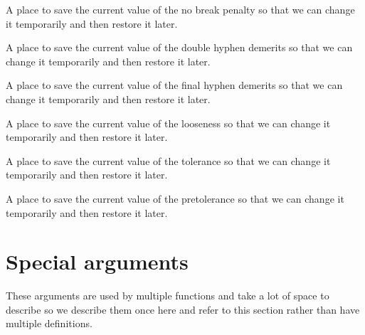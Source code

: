 A place to save the current value of the no break penalty so that we can change it temporarily and then restore it later.

A place to save the current value of the double hyphen demerits so that we can change it temporarily and then restore it later.

A place to save the current value of the final hyphen demerits so that we can change it temporarily and then restore it later.

A place to save the current value of the looseness so that we can change it temporarily and then restore it later.

A place to save the current value of the tolerance so that we can change it temporarily and then restore it later.

A place to save the current value of the pretolerance so that we can change it temporarily and then restore it later.



\section{Special arguments}

These arguments are used by multiple functions and take a lot of space
to describe so we describe them once here and refer to this section
rather than have multiple definitions.

